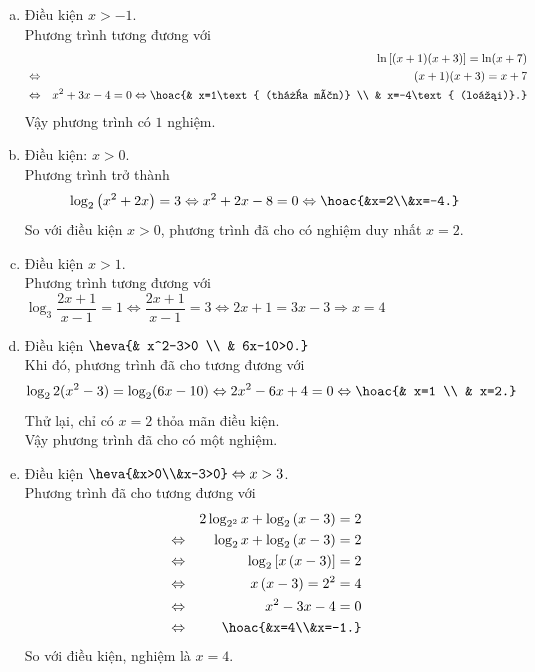 \begin{vd}
{\begin{enumerate}[a)]
			\item Điều kiện $x>-1$.\\
			Phương trình tương đương với
			\begin{eqnarray*}
				& &\ln\left[(x+1)(x+3)\right]=\ln(x+7)\\
				&\Leftrightarrow &(x+1)(x+3)=x+7\\
				&\Leftrightarrow & x^2+3x-4=0\Leftrightarrow \hoac{& x=1\text{ (thỏa mãn)} \\ & x=-4\text{ (loại)}.}
			\end{eqnarray*}
			Vậy phương trình có $1$ nghiệm.
			\item Điều kiện: $ x>0 $. \\
			Phương trình trở thành $$ \log_2 \left(x^2+2x\right) = 3 \Leftrightarrow x^2 + 2x - 8 = 0 \Leftrightarrow \hoac{&x=2\\&x=-4.} $$
			So với điều kiện $ x>0 $, phương trình đã cho có nghiệm duy nhất $ x = 2 $.
			\item Điều kiện $x>1$.\\ Phương trình tương đương với $\log_3\dfrac{2x+1}{x-1}=1\Leftrightarrow \dfrac{2x+1}{x-1}=3\Leftrightarrow 2x+1=3x-3\Rightarrow x=4$
			\item Điều kiện $\heva{& x^2-3>0 \\ & 6x-10>0.}$\\
			Khi đó, phương trình đã cho tương đương với $$\log_22(x^2-3)=\log_2 (6x-10)\Leftrightarrow2x^2-6x+4=0\Leftrightarrow\hoac{& x=1 \\ & x=2.}$$
			Thử lại, chỉ có $x=2$ thỏa mãn điều kiện.\\
			Vậy phương trình đã cho có một nghiệm.
			\item Điều kiện $\heva{&x>0\\&x-3>0} \Leftrightarrow x>3$.\\
			Phương trình đã cho tương đương với
			\begin{eqnarray*}
				&  & 2\log_{2^2}{x}+\log_{2}\left(x-3\right)=2\\
				& \Leftrightarrow & \log_{2}{x}+\log_{2}\left(x-3\right)=2\\
				& \Leftrightarrow & \log_{2}\left[x\left(x-3\right)\right]=2\\
				& \Leftrightarrow & x\left(x-3\right)={2}^{2}=4\\
				& \Leftrightarrow &  x^2-3x-4=0\\
				& \Leftrightarrow & \hoac{&x=4\\&x=-1.}
			\end{eqnarray*}
			So với điều kiện, nghiệm là $x=4$.

\end{enumerate}}
\end{vd}
